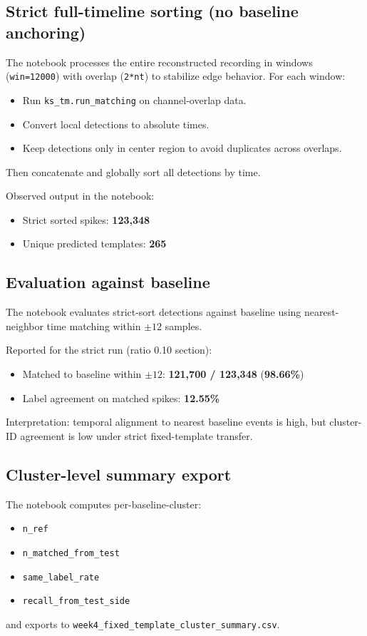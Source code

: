 ﻿\documentclass[11pt]{article}
\begin{document}
\subsection{Strict full-timeline sorting (no baseline anchoring)}
The notebook processes the entire reconstructed recording in windows (\texttt{win=12000}) with overlap (\texttt{2*nt}) to stabilize edge behavior. For each window:
\begin{itemize}
  \item Run \texttt{ks\_tm.run\_matching} on channel-overlap data.
  \item Convert local detections to absolute times.
  \item Keep detections only in center region to avoid duplicates across overlaps.
\end{itemize}
Then concatenate and globally sort all detections by time.

Observed output in the notebook:
\begin{itemize}
  \item Strict sorted spikes: \textbf{123,348}
  \item Unique predicted templates: \textbf{265}
\end{itemize}

\subsection{Evaluation against baseline}
The notebook evaluates strict-sort detections against baseline using nearest-neighbor time matching within $\pm 12$ samples.

Reported for the strict run (ratio 0.10 section):
\begin{itemize}
  \item Matched to baseline within $\pm 12$: \textbf{121,700 / 123,348} (\textbf{98.66\%})
  \item Label agreement on matched spikes: \textbf{12.55\%}
\end{itemize}

Interpretation: temporal alignment to nearest baseline events is high, but cluster-ID agreement is low under strict fixed-template transfer.

\subsection{Cluster-level summary export}
The notebook computes per-baseline-cluster:
\begin{itemize}
  \item \texttt{n\_ref}
  \item \texttt{n\_matched\_from\_test}
  \item \texttt{same\_label\_rate}
  \item \texttt{recall\_from\_test\_side}
\end{itemize}
and exports to \texttt{week4\_fixed\_template\_cluster\_summary.csv}.
\end{document}
